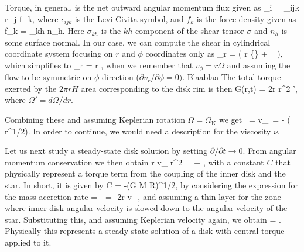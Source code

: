 Torque, in general, is the net outward angular momentum flux given as
\be
\tau_i = \epsilon_{ijk} r_j f_k,
\ee
where $\epsilon_{ijk}$ is the Levi-Civita symbol, and $f_k$ is the force density given as
\be
f_k = \sigma_{kh} n_h.
\ee
Here $\sigma_{kh}$ is the $kh$-component of the shear tensor $\sigma$ and $n_h$ is some surface normal.
In our case, we can compute the shear in cylindrical coordinate system focusing on $r$ and $\phi$ coordinates only as
\be
\sigma_{r\phi} = \rho \nu \left( r  \left\{\right\} +   \right),
\ee
which simplifies to 
\be
\sigma_{r\phi} = \rho \nu r ,
\ee
when we remember that $v_{\phi} = r \Omega$ and assuming the flow to be symmetric on $\phi$-direction ($\partial v_r/\partial \phi = 0)$.
Blaablaa \cite[see, e.g.,][]{ChapmanCowling52}
The total torque exerted by the $2\pi r H$ area corresponding to the disk rim is then
\be
G(r,t) = 2\pi r \nu \Sigma r^2 \Omega',
\ee
where $\Omega' = d\Omega/dr$.

Combining these and assuming Keplerian rotation $\Omega = \Omega_{\mathrm{K}}$ we get
\be
{} =  
\ee
\be
v_{} = -  ( \nu \Sigma r^{1/2}).
\ee
In order to continue, we would need a description for the viscosity $\nu$.


Let us next study a steady-state disk solution by setting $\partial/\partial t \rightarrow 0$.
From angular momentum conservation we then obtain
\be
r \Sigma v_{} r^2 \Omega =  + ,
\ee
with a constant $C$ that physically represent a torque term from the coupling of the inner disk and the star.
In short, it is given by
\be
C = -\Mdot (G M R)^{1/2},
\ee
by considering the expression for the mass accretion rate 
\be
\Mdot = - = -2\pi r \Sigma v_{},
\ee
and assuming a thin layer for the zone where inner disk angular velocity is slowed down to the angular velocity of the star.
Substituting this, and assuming Keplerian velocity again, we obtain
\be
\nu \Sigma = \frac{\Mdot}{3\pi} .
\ee
Physically this represents a steady-state solution of a disk with central torque applied to it.

